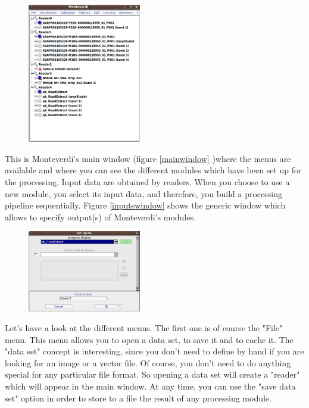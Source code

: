 \begin{figure}
  \center
  \includegraphics[width=0.44\textwidth]{../Art/MonteverdiImages/monteverdi_mainwindow.png}
  \label{fig:mainwindow}
\end{figure}

This is Monteverdi's main window (figure \ref{mainwindow} )where the
menus are available and where you can see the different modules which
have been set up for the processing. Input data are obtained by
readers. When you choose to use a new module, you select its input
data, and therefore, you build a processing pipeline sequentially.
Figure \ref{inputswindow} shows the generic window which allows to
specify output(s) of Monteverdi's modules.  

\begin{figure} \center
  \includegraphics[width=0.44\textwidth]{../Art/MonteverdiImages/monteverdi_inputs_window.png}
    \label{fig:inputswindow} 
\end{figure} 
Let's have
a look at the different menus. The first one is of course the "File"
menu. This menu allows you to open a data set, to save it and to cache
it. The "data set" concept is interesting, since you don't need to
define by hand if you are looking for an image or a vector file. Of
course, you don't need to do anything special for any particular file
format. So opening a data set will create a "reader" which will appear
in the main window. At any time, you can use the "save data set"
option in order to store to a file the result of any processing
module.


